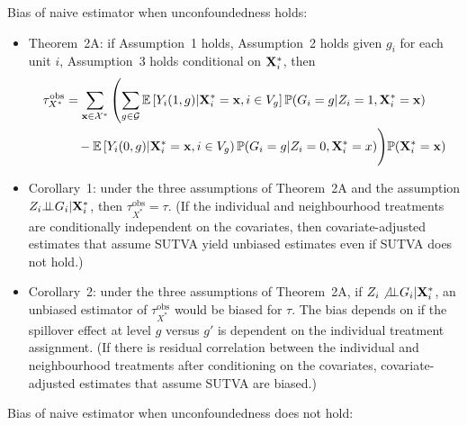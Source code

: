 \documentclass[10pt]{article}
\begin{document}
Bias of naive estimator when unconfoundedness holds:

\begin{itemize}

\item
Theorem~2A: if Assumption~1 holds, Assumption~2 holds given $g_i$ for each unit $i$, Assumption~3 holds conditional on $\mathbf{X}_i^*$, then
\begin{align*}
\tau_{X^*}^\text{obs} &= \sum_{\mathbf{x}\in\mathcal{X}^*}\left(\sum_{g\in\mathcal{G}}\mathbb{E}\left[Y_i(1,g)|\mathbf{X}_i^*=\mathbf{x},i\in V_g\right]\mathbb{P}(G_i=g|Z_i=1,\mathbf{X}_i^*=\mathbf{x}) \right. \\
&\quad -\mathbb{E}\left[Y_i(0,g)|\mathbf{X}_i^*=\mathbf{x},i\in V_g\right)\mathbb{P}(G_i=g|Z_i=0,\mathbf{X}_i^*=x)\Bigg)\mathbb{P}(\mathbf{X}_i^*=\mathbf{x})
\end{align*}

\item
Corollary~1: under the three assumptions of Theorem~2A and the assumption $Z_i{\perp\!\!\!\perp} G_i|\mathbf{X}_i^*$, then $\tau_{X^*}^\text{obs} = \tau$. (If the individual and neighbourhood treatments are conditionally independent on the covariates, then covariate-adjusted estimates that assume SUTVA yield unbiased estimates even if SUTVA does not hold.)

\item
Corollary~2: under the three assumptions of Theorem~2A, if $Z_i\not{\perp\!\!\!\perp} G_i|\mathbf{X}_i^*$, an unbiased estimator of $\tau_{X^*}^\text{obs}$ would be biased for $\tau$. The bias depends on if the spillover effect at level $g$ versus $g'$ is dependent on the individual treatment assignment. (If there is residual correlation between the individual and neighbourhood treatments after conditioning on the covariates, covariate-adjusted estimates that assume SUTVA are biased.)

\end{itemize}

Bias of naive estimator when unconfoundedness does not hold:
\end{document}
